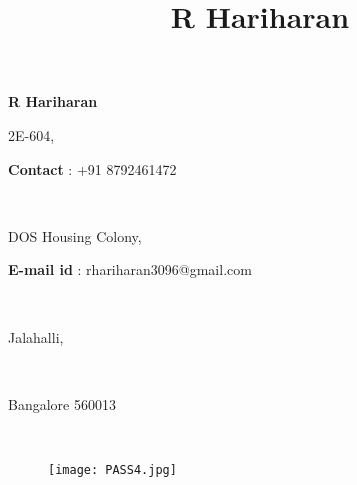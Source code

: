 \documentclass[a4paper,12pt,final]{article}
\title{R Hariharan}
\newcommand\textbox[1]{%
	\parbox{.500\textwidth}{#1}%
}
\begin{document}
	\begin{center}
		\bfseries \LARGE R Hariharan
	\end{center}
	\noindent\makebox[\linewidth]{\rule{\paperwidth}{0.4pt}}
	\noindent\textbox{\small 2E-604,\hfill}\textbox{\hfill \small \textbf{Contact} : +91 8792461472}\\	
	\noindent\textbox{\small DOS Housing Colony,\hfill}\textbox{\hfill \small \textbf{E-mail id} : rhariharan3096@gmail.com}\\	
	\noindent\textbox{\small Jalahalli,}\\
	\noindent\textbox{\small Bangalore 560013}\\	
	\begin{figure}[h]
		\noindent\textbox{\hfill}\textbox{\hfill \texttt{[image: PASS4.jpg]}}
	\end{figure}\\	
\end{document}

